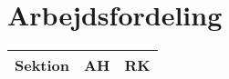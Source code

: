 \section*{Arbejdsfordeling}
\begin{table}[H]
  \centering
  \begin{tabular}{@{}lcc@{}}
    \toprule
    Sektion & AH & RK \\
    \midrule
    \bottomrule
  \end{tabular}
\end{table}